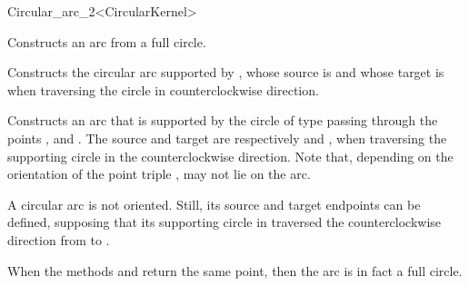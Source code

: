 \begin{ccRefClass}{Circular_arc_2<CircularKernel>}


\ccIsModel


\ccCreation
{}

\ccThreeToTwo

{Constructs an arc from a full circle.}

{Constructs the circular arc supported by , whose source is
   and whose target is  when traversing the circle in
  counterclockwise direction. 
}

{Constructs an arc that is supported by the circle of type
   passing through the points ,
   and . The source and target are respectively 
  and , when traversing the supporting circle in the
  counterclockwise direction. 
  Note that, depending on the orientation of the point triple
  ,  may not lie on the arc. 
}

\ccAccessFunctions

\ccThreeToTwo


A circular arc is not oriented. Still, its source and target endpoints
can be defined, supposing that its supporting circle in traversed the
counterclockwise direction from  to . 

\ccGlue
{}

When the methods  and  return the same point, then 
the arc is in fact a full circle. %


\end{ccRefClass}
